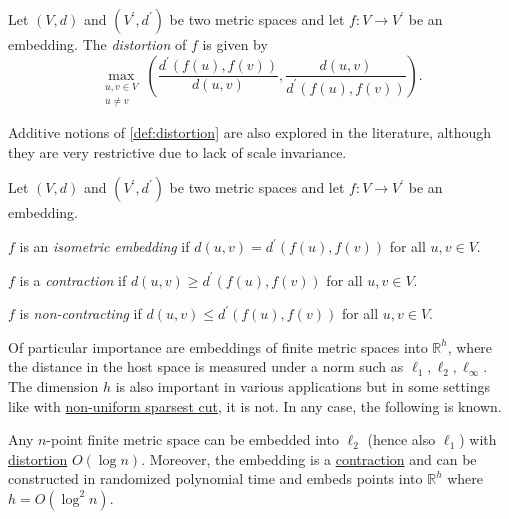 \begin{definition}[Distortion]\label{def:distortion}
	Let \((V, d)\) and \((V^{\prime} , d^{\prime} )\) be two metric spaces and let \(f \colon V \to V^{\prime} \) be an embedding. The \emph{distortion} of \(f\) is given by
	\[
		\max _{\substack{u, v \in V \\ u \neq v}} \left( \frac{d^{\prime} (f(u), f(v))}{d(u, v)} , \frac{d(u, v)}{d^{\prime} (f(u), f(v))}\right) .
	\]
\end{definition}

\begin{remark}
	Additive notions of \autoref{def:distortion} are also explored in the literature, although they are very restrictive due to lack of scale invariance.
\end{remark}

\begin{definition*}
	Let \((V, d)\) and \((V^{\prime} , d^{\prime} )\) be two metric spaces and let \(f \colon V \to V^{\prime} \) be an embedding.
	\begin{definition}\label{def:isometric-embedding}
		\(f\) is an \emph{isometric embedding} if \(d(u, v) = d^{\prime} (f(u), f(v))\) for all \(u, v \in V\).
	\end{definition}
	\begin{definition}[Contraction]\label{def:contraction}
		\(f\) is a \emph{contraction} if \(d(u, v) \geq d^{\prime} (f(u), f(v))\) for all \(u, v \in V\).
	\end{definition}
	\begin{definition}\label{def:non-contracting}
		\(f\) is \emph{non-contracting} if \(d(u, v) \leq d^{\prime} (f(u), f(v))\) for all \(u, v \in V\).
	\end{definition}
\end{definition*}

Of particular importance are embeddings of finite metric spaces into \(\mathbb{R} ^h\), where the distance in the host space is measured under a norm such as \(\ell _1, \ell _2, \ell _\infty \). The dimension \(h\) is also important in various applications but in some settings like with \hyperref[prb:non-uniform-sparsest-cut]{non-uniform sparsest cut}, it is not. In any case, the following is known.

\begin{theorem}[Bourgain]\label{thm:Bourgain}
	Any \(n\)-point finite metric space can be embedded into \(\ell _2\) (hence also \(\ell _1\)) with \hyperref[def:distortion]{distortion} \(O(\log n)\). Moreover, the embedding is a \hyperref[def:contraction]{contraction} and can be constructed in randomized polynomial time and embeds points into \(\mathbb{R} ^h\) where \(h = O(\log ^2 n)\).
\end{theorem}

